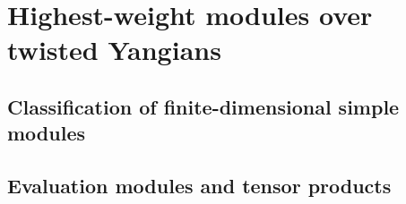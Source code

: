 \section{Highest-weight modules over twisted Yangians} \label{section: highest_weight_modules_for_twisted_yangians}
    \subsection{Classification of finite-dimensional simple modules}

    \subsection{Evaluation modules and tensor products}